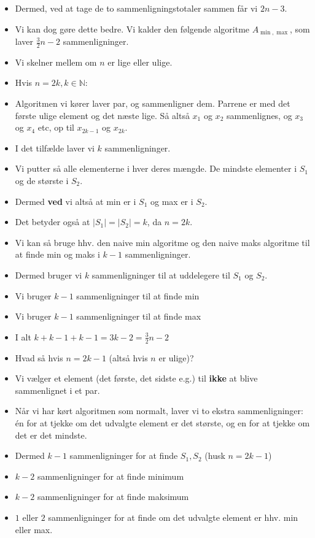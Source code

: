 \begin{frame}[allowframebreaks]
\begin{itemize}
  \item Dermed, ved at tage de to sammenligningstotaler sammen får vi $2n-3$.
  \item Vi kan dog gøre dette bedre. Vi kalder den følgende algoritme $A_{\min, \max}$, som laver $\frac{3}{2}n - 2$ sammenligninger.
  \item Vi skelner mellem om $n$ er lige eller ulige.
  \item Hvis $n = 2k, k \in \mathbb{N}$:
  \item Algoritmen vi kører laver par, og sammenligner dem. Parrene er med det første ulige element og det næste lige. Så altså $x_{1}$ og $x_{2}$ sammenlignes, og $x_{3}$ og $x_{4}$ etc, op til $x_{2k-1}$ og $x_{2k}$.
  \item I det tilfælde laver vi $k$ sammenligninger.
  \item Vi putter så alle elementerne i hver deres mængde. De mindste elementer i $S_{1}$ og de største i $S_{2}$.
  \item Dermed \textbf{ved} vi altså at min er i $S_{1}$ og max er i $S_{2}$.
  \item Det betyder også at $|S_{1}| = |S_{2}| = k$, da $n = 2k$.
  \item Vi kan så bruge hhv. den naive min algoritme og den naive maks algoritme til at finde min og maks i $k-1$ sammenligninger.
  \item Dermed bruger vi $k$ sammenligninger til at uddelegere til $S_{1}$ og $S_{2}$.
  \item Vi bruger $k-1$ sammenligninger til at finde min
  \item Vi bruger $k-1$ sammenligninger til at finde max
  \item I alt $k + k-1 + k-1 = 3k-2 = \frac{3}{2}n - 2$
  \item Hvad så hvis $n = 2k-1$ (altså hvis $n$ er ulige)?
  \item Vi vælger et element (det første, det sidste e.g.) til \textbf{ikke} at blive sammenlignet i et par.
  \item Når vi har kørt algoritmen som normalt, laver vi to ekstra sammenligninger: én for at tjekke om det udvalgte element er det største, og en for at tjekke om det er det mindste.
  \item Dermed $k-1$ sammenligninger for at finde $S_{1}, S_{2}$ (husk $n = 2k-1$)
  \item $k-2$ sammenligninger for at finde minimum
  \item $k-2$ sammenligninger for at finde maksimum
  \item $1$ eller $2$ sammenligninger for at finde om det udvalgte element er hhv. min eller max.

\end{itemize}
\end{frame}
